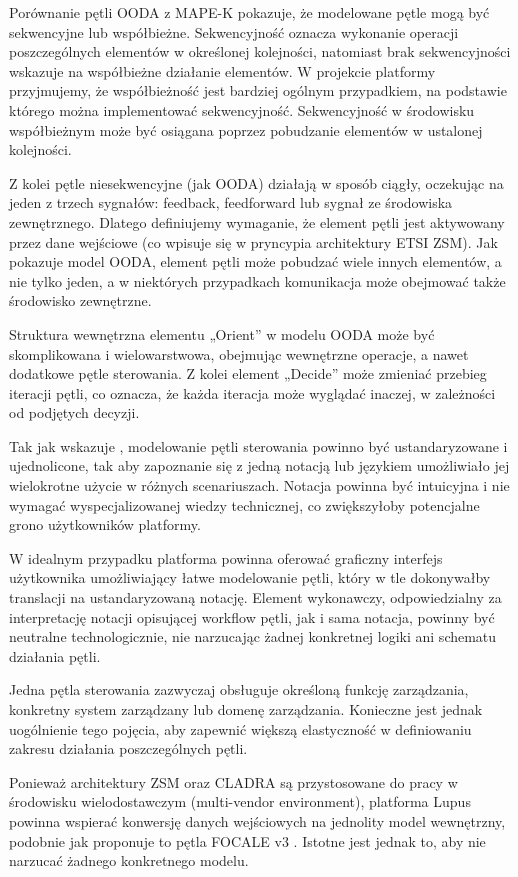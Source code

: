 Porównanie pętli OODA z MAPE-K pokazuje, że modelowane pętle mogą być sekwencyjne lub współbieżne. Sekwencyjność oznacza wykonanie operacji poszczególnych elementów w określonej kolejności, natomiast brak sekwencyjności wskazuje na współbieżne działanie elementów. W projekcie platformy przyjmujemy, że współbieżność jest bardziej ogólnym przypadkiem, na podstawie którego można implementować sekwencyjność. Sekwencyjność w środowisku współbieżnym może być osiągana poprzez pobudzanie elementów w ustalonej kolejności.

Z kolei pętle niesekwencyjne (jak OODA) działają w sposób ciągły, oczekując na jeden z trzech sygnałów: feedback, feedforward lub sygnał ze środowiska zewnętrznego. Dlatego definiujemy wymaganie, że element pętli jest aktywowany przez dane wejściowe (co wpisuje się w pryncypia architektury ETSI ZSM). Jak pokazuje model OODA, element pętli może pobudzać wiele innych elementów, a nie tylko jeden, a w niektórych przypadkach komunikacja może obejmować także środowisko zewnętrzne.

Struktura wewnętrzna elementu „Orient” w modelu OODA może być skomplikowana i wielowarstwowa, obejmując wewnętrzne operacje, a nawet dodatkowe pętle sterowania. Z kolei element „Decide” może zmieniać przebieg iteracji pętli, co oznacza, że każda iteracja może wyglądać inaczej, w zależności od podjętych decyzji.

Tak jak wskazuje \cite{fallon2019}, modelowanie pętli sterowania powinno być ustandaryzowane i ujednolicone, tak aby zapoznanie się z jedną notacją lub językiem umożliwiało jej wielokrotne użycie w różnych scenariuszach. Notacja powinna być intuicyjna i nie wymagać wyspecjalizowanej wiedzy technicznej, co zwiększyłoby potencjalne grono użytkowników platformy.

W idealnym przypadku platforma powinna oferować graficzny interfejs użytkownika umożliwiający łatwe modelowanie pętli, który w tle dokonywałby translacji na ustandaryzowaną notację. Element wykonawczy, odpowiedzialny za interpretację notacji opisującej workflow pętli, jak i sama notacja, powinny być neutralne technologicznie, nie narzucając żadnej konkretnej logiki ani schematu działania pętli.

Jedna pętla sterowania zazwyczaj obsługuje określoną funkcję zarządzania, konkretny system zarządzany lub domenę zarządzania. Konieczne jest jednak uogólnienie tego pojęcia, aby zapewnić większą elastyczność w definiowaniu zakresu działania poszczególnych pętli.

Ponieważ architektury ZSM oraz CLADRA są przystosowane do pracy w środowisku wielodostawczym (multi-vendor environment), platforma Lupus powinna wspierać konwersję danych wejściowych na jednolity model wewnętrzny, podobnie jak proponuje to pętla FOCALE v3 \cite{strassner2009}. Istotne jest jednak to, aby nie narzucać żadnego konkretnego modelu.

